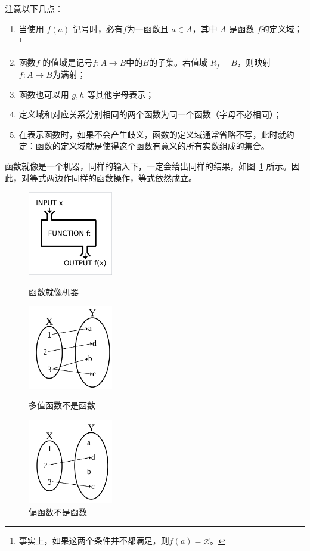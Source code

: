 \documentclass[a4paper,openany]{ctexbook}
\begin{document}
注意以下几点：
\begin{enumerate}
    \item 当使用 \(f(a)\) 记号时，必有\(f\)为一函数且 \(a\in A\)，其中 \(A\) 是函数 \(f\)的定义域；\footnote{事实上，如果这两个条件并不都满足，则\(f(a)=\varnothing\)。}
    \item 函数\(f\) 的值域是记号\(f:A\rightarrow B\)中的\(B\)的子集。若值域 \(R_f=B\)，则映射 \(f:A\rightarrow B\)为满射；
    \item 函数也可以用 \(g,h\) 等其他字母表示；
    \item 定义域和对应关系分别相同的两个函数为同一个函数（字母不必相同）；
    \item 在表示函数时，如果不会产生歧义，函数的定义域通常省略不写，此时就约定：函数的定义域就是使得这个函数有意义的所有实数组成的集合。
\end{enumerate}

函数就像是一个机器，同样的输入下，一定会给出同样的结果，如图~\ref{fgr:functionmachine} 所示。因此，对等式两边作同样的函数操作，等式依然成立。

\begin{figure}
    \centering
    \begin{minipage}{10em}
        \centering
        \includegraphics[width=10em]{image10.png}
        \caption{函数就像机器}\label{fgr:functionmachine}
    \end{minipage}
    \hfill
    \begin{minipage}{10em}
        \centering
        \includegraphics[width=10em]{image11.png}
        \caption{多值函数不是函数}
    \end{minipage}
    \hfill
    \begin{minipage}{10em}
        \centering
        \includegraphics[width=10em]{image12.png}
        \caption{偏函数不是函数}
    \end{minipage}
\end{figure}
\end{document}
